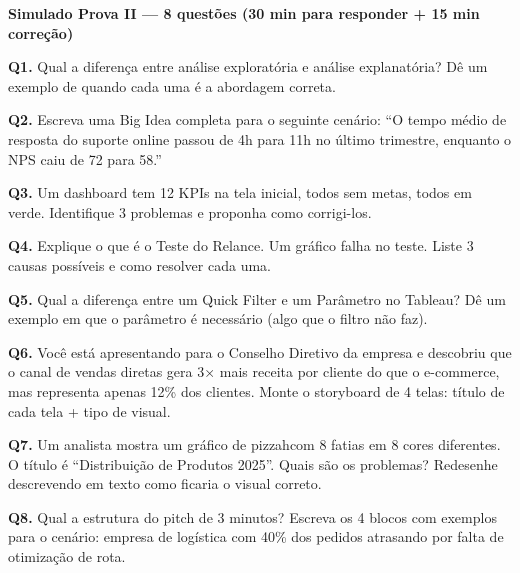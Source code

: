 \begin{BoardBox}
\textbf{Simulado Prova II — 8 questões (30 min para responder + 15 min correção)}

\textbf{Q1.} Qual a diferença entre análise exploratória e análise explanatória?
Dê um exemplo de quando cada uma é a abordagem correta.

\textbf{Q2.} Escreva uma Big Idea completa para o seguinte cenário:
``O tempo médio de resposta do suporte online passou de 4h para 11h no último trimestre,
enquanto o NPS caiu de 72 para 58.''

\textbf{Q3.} Um dashboard tem 12 KPIs na tela inicial, todos sem metas,
todos em verde. Identifique 3 problemas e proponha como corrigi-los.

\textbf{Q4.} Explique o que é o Teste do Relance. Um gráfico falha no teste.
Liste 3 causas possíveis e como resolver cada uma.

\textbf{Q5.} Qual a diferença entre um Quick Filter e um Parâmetro no Tableau?
Dê um exemplo em que o parâmetro é necessário (algo que o filtro não faz).

\textbf{Q6.} Você está apresentando para o Conselho Diretivo da empresa e descobriu
que o canal de vendas diretas gera 3× mais receita por cliente do que o e-commerce,
mas representa apenas 12\% dos clientes. Monte o storyboard de 4 telas:
título de cada tela + tipo de visual.

\textbf{Q7.} Um analista mostra um gráfico de pizzahcom 8 fatias em 8 cores diferentes.
O título é ``Distribuição de Produtos 2025''. Quais são os problemas? Redesenhe
descrevendo em texto como ficaria o visual correto.

\textbf{Q8.} Qual a estrutura do pitch de 3 minutos? Escreva os 4 blocos com
exemplos para o cenário: empresa de logística com 40\% dos pedidos atrasando
por falta de otimização de rota.
\end{BoardBox}

